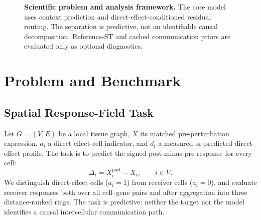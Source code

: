 \begin{figure}[t]
\centering
{}
\hfill
{}
\hfill
{}
\caption{\textbf{Scientific problem and analysis framework.}
The core model uses context prediction and direct-effect-conditioned residual
routing. The separation is predictive, not an identifiable causal
decomposition. Reference-ST and cached communication priors are evaluated only
as optional diagnostics.}
\label{fig:main_framework}
\end{figure}

\section{Problem and Benchmark}
\label{sec:data_construction}
\subsection{Spatial Response-Field Task}
Let $G=(V,E)$ be a local tissue graph, $X$ its matched pre-perturbation
expression, $a_i$ a direct-effect-cell indicator, and $d_i$ a measured or
predicted direct-effect profile. The task is to predict the signed
post-minus-pre response for every cell:
\[
\Delta_i=X_i^{\mathrm{post}}-X_i,\qquad i\in V.
\]
We distinguish direct-effect cells ($a_i=1$) from receiver cells ($a_i=0$),
and evaluate receiver responses both over all cell--gene pairs and after
aggregation into three distance-ranked rings. The task is predictive: neither
the target nor the model identifies a causal intercellular communication path.

